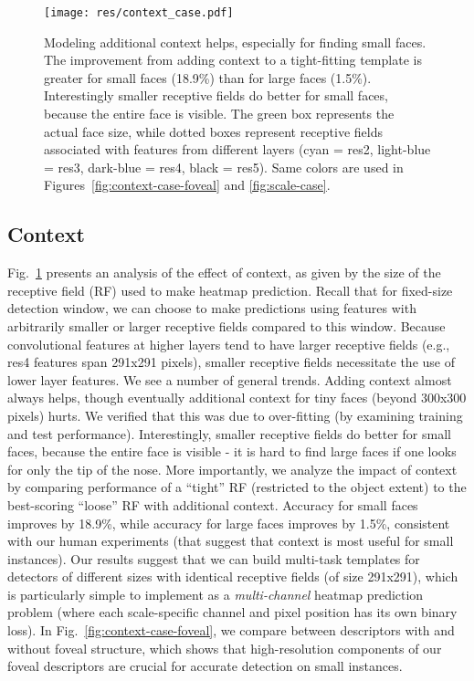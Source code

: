 \documentclass[10pt,twocolumn,letterpaper]{article}
\begin{document}
\begin{figure}
  \centering
  \texttt{[image: res/context\_case.pdf]}
  \caption{Modeling additional context helps, especially for finding small faces. The improvement from adding context to a tight-fitting template is greater for small faces (18.9\%) than for large faces (1.5\%). Interestingly smaller receptive fields do better for small faces, because the entire face is
visible. The green box represents the actual face size, while dotted boxes represent receptive fields associated with features from different layers (cyan = res2, light-blue = res3, dark-blue = res4, black = res5). Same colors are used in Figures~\ref{fig:context-case-foveal} and \ref{fig:scale-case}. }
  \label{fig:context-case}  
\end{figure}

\subsection{Context}
\label{sec:context}







Fig.~\ref{fig:context-case} presents an analysis of the effect of context, as given by the size of the receptive field (RF) used to make heatmap prediction. Recall that for fixed-size detection window, we can choose to make predictions using features with arbitrarily smaller or larger receptive fields compared to this window. Because convolutional features at higher layers tend to have larger receptive fields (e.g., res4 features span 291x291 pixels), smaller receptive fields necessitate the use of lower layer features. We see a number of general trends. Adding context almost always helps, though eventually additional context for tiny faces (beyond 300x300 pixels) hurts. We verified that this was due to over-fitting (by examining training and test performance). Interestingly, smaller receptive fields do better for small faces, because the entire face is visible - it is hard to find large faces if one looks for only the tip of the nose. More importantly, we analyze the impact of context by comparing performance of  a ``tight'' RF (restricted to the object extent) to the best-scoring ``loose''  RF with additional context. Accuracy for small faces improves by 18.9\%, while accuracy for large faces improves by 1.5\%, consistent with our human experiments (that suggest that context is most useful for small instances). Our results suggest that we can build multi-task templates for detectors of different sizes with identical receptive fields (of size 291x291), which is particularly simple to implement as a {\em multi-channel} heatmap prediction problem (where each scale-specific channel and pixel position has its own binary loss). In Fig.~\ref{fig:context-case-foveal}, we compare between descriptors with and without foveal structure, which shows that high-resolution components of our foveal descriptors are crucial for accurate detection on small instances. 
 
\end{document}
